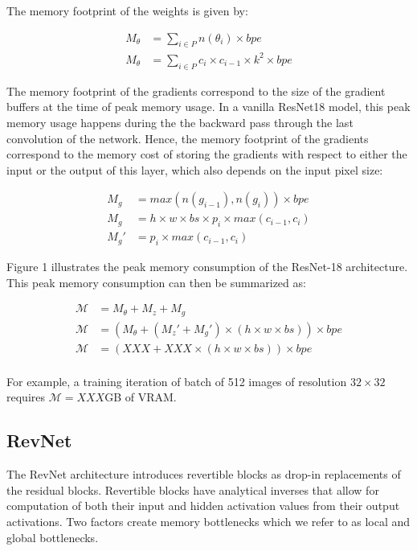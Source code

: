 \documentclass[twocolumn]{bmcart}
\begin{document}
The memory footprint of the weights is given by:

\begin{subequations}
\begin{align}
 M_{\theta} &= \sum_{i \in P}  n(\theta_i)\times bpe \\
 M_{\theta} &= \sum_{i \in P} c_i \times c_{i-1} \times k^2 \times bpe
\end{align}
\end{subequations}

The memory footprint of the gradients correspond to the size of the gradient buffers at the time of peak memory usage. In a vanilla ResNet18 model, this peak memory usage happens during the the backward pass through the last convolution of the network.
Hence, the memory footprint of the gradients correspond to the memory cost of storing the gradients with respect to either the input or the output of this layer, which also depends on the input pixel size:

\begin{subequations}
\begin{align}
M_{g}  &= max(n(g_{i-1}), n(g_i)) \times bpe \\
M_{g}  &= h \times w \times bs \times p_i \times max(c_{i-1}, c_i) \\ 
M_{g}' &= p_i \times max(c_{i-1}, c_i)
\end{align}
\end{subequations}

Figure 1 illustrates the peak memory consumption of the ResNet-18 architecture.
This peak memory consumption can then be summarized as:

\begin{subequations}
\begin{align}
\mathcal{M} &= M_{\theta} + M_{z} + M_{g} \\
\mathcal{M} &= (M_{\theta} + (M_{z}' + M_{g}') \times (h \times w \times bs)) \times bpe \\
\mathcal{M} &= (XXX + XXX \times (h \times w \times bs)) \times bpe \\ 
\end{align}
\end{subequations}

For example, a training iteration of batch of 512 images of resolution $32 \times 32$ requires $\mathcal{M}=XXX$GB of VRAM.

\subsection{RevNet}
The RevNet architecture introduces revertible blocks as drop-in replacements of the residual blocks. 
Revertible blocks have analytical inverses that allow for computation of both their input and hidden activation values from their output activations. 
Two factors create memory bottlenecks which we refer to as local and global bottlenecks.
\end{document}
